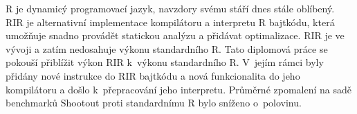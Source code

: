 R je dynamicý programovací jazyk, navzdory svému stáří dnes stále oblíbený. RIR je alternativní implementace kompilátoru a interpretu R bajtkódu, která umožňuje snadno provádět statickou analýzu a přidávat optimalizace. RIR je ve vývoji a zatím nedosahuje výkonu standardního R. Tato diplomová práce se pokouší přiblížit výkon RIR k~výkonu standardního R. V~jejím rámci byly přidány nové instrukce do RIR bajtkódu a nová funkcionalita do jeho kompilátoru a došlo k~přepracování jeho interpretu. Průměrné zpomalení na sadě benchmarků Shootout proti standardnímu R bylo sníženo o~polovinu.
